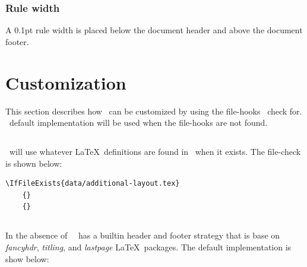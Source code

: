 \documentclass[12pt]{tlc-article}
\begin{document}
\subsubsection*{Rule width}
A 0.1pt rule width is placed below the document header and above the document
footer.

\clearpage
\section{Customization}
This section describes how \tlcA\ can be customized by using the file-hooks
\tlcA\ check for.  \tlcA\ default implementation will be used when the
file-hooks are not found.

\bigskip

%

\subsection{\tlcAL}
\tlcA\ will use whatever \LaTeX\ definitions are found in \tlcAL\ when it
exists.  The file-check is shown
below:

\begin{lstlisting}[basicstyle=\tiny]
  \IfFileExists{data/additional-layout.tex}
    {}
    {}
\end{lstlisting}

\subsection{\tlcHF}
In the absence of \tlcAL\, \tlcA\ has a builtin header and footer strategy that
is base on \textit{fancyhdr}, \textit{titling}, and \textit{lastpage} \LaTeX\
packages. The default implementation is show below:
\end{document}
